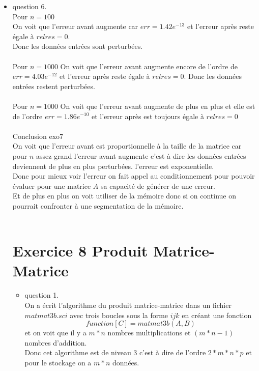 \documentclass[]{article}
\begin{document}
\begin{itemize}
\begin{itemize}
\item {question 6. \\}
Pour $n=100$\\
On voit que l'erreur avant augmente car $err=1.42e^{-13}$ et l'erreur après reste égale à $relres=0$.\\
Donc les données entrées sont  perturbées.\\
\\
Pour $n=1000$
On voit que l'erreur avant augmente encore de l'ordre de $err=4.03e^{-12}$ et l'erreur après reste égale à $relres=0$.
Donc les données entrées restent perturbées.\\
\\
Pour $n=1000$
On voit que l'erreur avant augmente de plus en plus et elle est de l'ordre $err=1.86e^{-10} $ et l'erreur après est toujours égale à $relres=0$ \\
\\
Conclusion exo7\\
On voit que l'erreur avant est proportionnelle à la taille de la matrice car pour $n$ assez grand l'erreur avant augmente c'est à dire les données entrées deviennent de plus en plus  perturbées. l'erreur est exponentielle.
\\
Donc pour mieux voir l'erreur on fait appel au conditionnement pour pouvoir évaluer pour une matrice $A$ sa capacité de générer de une erreur.\\
Et de plus en plus on voit utiliser de la mémoire donc si on continue on pourrait confronter à une segmentation de la mémoire.\\
\\

\section{Exercice 8 Produit Matrice-Matrice}
\begin{itemize}

\item{question 1.\\}
On a écrit l'algorithme du produit matrice-matrice dans un fichier $ matmat3b.sci$ avec trois boucles sous la forme $ijk$  en créant une fonction $$function [C] = matmat3b(A,B)$$ et on voit que il y a $m*n$ nombres multiplications et $(m*n -1)$ nombres d'addition.\\
Donc cet algorithme est de niveau 3 c'est à dire de l'ordre $2*m*n*p$ et pour le stockage on a $m*n$ données.\\


\end{itemize}
\end{itemize}
\end{itemize}
\end{document}
